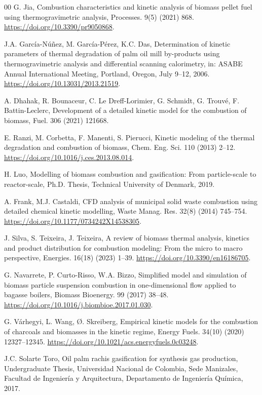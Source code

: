 \documentclass[preprint,12pt]{elsarticle}
\begin{document}
\begin{thebibliography}{00}
 G. Jia, Combustion characteristics and kinetic analysis of biomass pellet fuel using thermogravimetric analysis, Processes. 9(5) (2021) 868. \url{https://doi.org/10.3390/pr9050868}.

 J.A. García-Núñez, M. García-Pérez, K.C. Das, Determination of kinetic parameters of thermal degradation of palm oil mill by-products using thermogravimetric analysis and differential scanning calorimetry, in: ASABE Annual International Meeting, Portland, Oregon, July 9–12, 2006. \url{https://doi.org/10.13031/2013.21519}.

 A. Dhahak, R. Bounaceur, C. Le Dreff-Lorimier, G. Schmidt, G. Trouvé, F. Battin-Leclerc, Development of a detailed kinetic model for the combustion of biomass, Fuel. 306 (2021) 121668. 

 E. Ranzi, M. Corbetta, F. Manenti, S. Pierucci, Kinetic modeling of the thermal degradation and combustion of biomass, Chem. Eng. Sci. 110 (2013) 2–12. \url{https://doi.org/10.1016/j.ces.2013.08.014}.

 H. Luo, Modelling of biomass combustion and gasification: From particle-scale to reactor-scale, Ph.D. Thesis, Technical University of Denmark, 2019.

 A. Frank, M.J. Castaldi, CFD analysis of municipal solid waste combustion using detailed chemical kinetic modelling, Waste Manag. Res. 32(8) (2014) 745–754. \url{https://doi.org/10.1177/0734242X14538305}.

 J. Silva, S. Teixeira, J. Teixeira, A review of biomass thermal analysis, kinetics and product distribution for combustion modeling: From the micro to macro perspective, Energies. 16(18) (2023) 1--39. \url{https://doi.org/10.3390/en16186705}.

 G. Navarrete, P. Curto-Risso, W.A. Bizzo, Simplified model and simulation of biomass particle suspension combustion in one-dimensional flow applied to bagasse boilers, Biomass Bioenergy. 99 (2017) 38--48. \url{https://doi.org/10.1016/j.biombioe.2017.01.030}.

 G. Várhegyi, L. Wang, Ø. Skreiberg, Empirical kinetic models for the combustion of charcoals and biomasses in the kinetic regime, Energy Fuels. 34(10) (2020) 12327--12345. \url{https://doi.org/10.1021/acs.energyfuels.0c03248}.

 J.C. Solarte Toro, Oil palm rachis gasification for synthesis gas production, Undergraduate Thesis, Universidad Nacional de Colombia, Sede Manizales, Facultad de Ingeniería y Arquitectura, Departamento de Ingeniería Química, 2017.


\end{thebibliography}
\end{document}
